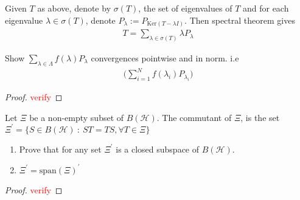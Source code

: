 

Given $T$ as above, denote by $\sigma(T)$, the set of eigenvalues of
$T$ and  for each eigenvalue $ \lambda \in \sigma(T)$, denote
$P_\lambda:= P_{\textrm{Ker}(T- \lambda I)}$. Then spectral theorem gives
\begin{align*}
  T = \sum_{\lambda \in  \sigma(T)}  \lambda P_\lambda
\end{align*}

\begin{exercise}
  Show $\sum_{\lambda \in  \Lambda}  f(\lambda) P_\lambda$
  convergences pointwise and in norm. i.e
  \begin{align*}
    \Big( \sum_{i = 1}^{N} f(\lambda_i) P_{\lambda_i}\Big)
  \end{align*}
\end{exercise}
\begin{proof}
  \textcolor{red}{verify}
\end{proof}

\begin{definition}
  Let $\Xi$ be a non-empty subset of $B(\mathcal{H})$. The commutant
  of $\Xi$, is the set $\Xi^\prime = \{ S \in B(\mathcal{H})  \ : \    ST
  = TS, \forall T \in \Xi \}$
\end{definition}

\begin{exercise}
  \begin{enumerate}
    \item  Prove that for any set $\Xi^\prime$ is a closed subspace
      of $B(\mathcal{H})$.
    \item $\Xi^\prime = \textrm{span}(\Xi)^\prime$
  \end{enumerate}
\end{exercise}
\begin{proof}
  \textcolor{red}{verify}
\end{proof}

